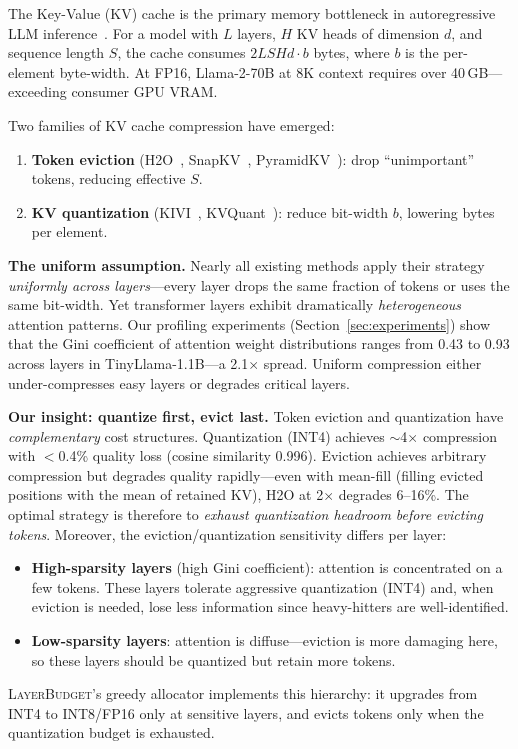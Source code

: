 \documentclass{article}
\newcommand{\layerbudget}{\textsc{LayerBudget}\xspace}
\newcommand{\nlayers}{L}
\newcommand{\nheads}{H}
\newcommand{\hdim}{d}
\begin{document}
The Key-Value (KV) cache is the primary memory bottleneck in autoregressive LLM inference~\citep{kwon2023efficient}.
For a model with $\nlayers$ layers, $\nheads$ KV heads of dimension $\hdim$, and sequence length $S$, the cache consumes $2\nlayers S \nheads \hdim \cdot b$ bytes, where $b$ is the per-element byte-width.
At FP16, Llama-2-70B at 8K context requires over 40\,GB---exceeding consumer GPU VRAM.

Two families of KV cache compression have emerged:
\begin{enumerate}
    \item \textbf{Token eviction} (H2O~\citep{zhang2024h2o}, SnapKV~\citep{snapkv2024}, PyramidKV~\citep{pyramidkv2024}): drop ``unimportant'' tokens, reducing effective $S$.
    \item \textbf{KV quantization} (KIVI~\citep{liu2024kivi}, KVQuant~\citep{hooper2024kvquant}): reduce bit-width $b$, lowering bytes per element.
\end{enumerate}

\textbf{The uniform assumption.}
Nearly all existing methods apply their strategy \emph{uniformly across layers}---every layer drops the same fraction of tokens or uses the same bit-width.
Yet transformer layers exhibit dramatically \emph{heterogeneous} attention patterns.
Our profiling experiments (Section~\ref{sec:experiments}) show that the Gini coefficient of attention weight distributions ranges from 0.43 to 0.93 across layers in TinyLlama-1.1B---a 2.1$\times$ spread.
Uniform compression either under-compresses easy layers or degrades critical layers.

\textbf{Our insight: quantize first, evict last.}
Token eviction and quantization have \emph{complementary} cost structures.
Quantization (INT4) achieves $\sim$4$\times$ compression with $<$0.4\% quality loss (cosine similarity 0.996).
Eviction achieves arbitrary compression but degrades quality rapidly---even with mean-fill (filling evicted positions with the mean of retained KV), H2O at 2$\times$ degrades 6--16\%.
The optimal strategy is therefore to \emph{exhaust quantization headroom before evicting tokens}.
Moreover, the eviction/quantization sensitivity differs per layer:
\begin{itemize}
    \item \textbf{High-sparsity layers} (high Gini coefficient): attention is concentrated on a few tokens. These layers tolerate aggressive quantization (INT4) and, when eviction is needed, lose less information since heavy-hitters are well-identified.
    \item \textbf{Low-sparsity layers}: attention is diffuse---eviction is more damaging here, so these layers should be quantized but retain more tokens.
\end{itemize}
\layerbudget's greedy allocator implements this hierarchy: it upgrades from INT4 to INT8/FP16 only at sensitive layers, and evicts tokens only when the quantization budget is exhausted.
\end{document}
